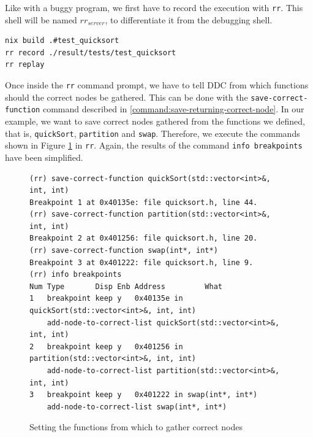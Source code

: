 Like with a buggy program, we first have to record the execution with \verb|rr|. This shell will be named \(rr_{server}\), to differentiate it from the debugging shell.
\begin{lstlisting}[language=bash, caption={Compiling, recording and replaying quickSort test cases}, frame=tb, label={lst:compileRecordReplayQuicksortTests}]
nix build .#test_quicksort
rr record ./result/tests/test_quicksort
rr replay
\end{lstlisting}
Once inside the \verb|rr| command prompt, we have to tell DDC from which functions should the correct nodes be gathered.
This can be done with the \verb|save-correct-function| command described in \ref{command:save-returning-correct-node}. In our example, we want to save correct nodes gathered from the functions we defined, that is, \verb|quickSort|, \verb|partition| and \verb|swap|. Therefore, we execute the commands shown in Figure \ref{fig:saving-correct-functions} in \verb|rr|. Again, the results of the command \verb|info breakpoints| have been simplified.
\begin{figure}[h]
    \centering
    \caption{Setting the functions from which to gather correct nodes}
    \label{fig:saving-correct-functions}
    \begin{verbatim}
(rr) save-correct-function quickSort(std::vector<int>&, int, int)
Breakpoint 1 at 0x40135e: file quicksort.h, line 44.
(rr) save-correct-function partition(std::vector<int>&, int, int) 
Breakpoint 2 at 0x401256: file quicksort.h, line 20.
(rr) save-correct-function swap(int*, int*) 
Breakpoint 3 at 0x401222: file quicksort.h, line 9.
(rr) info breakpoints
Num Type       Disp Enb Address         What
1   breakpoint keep y   0x40135e in quickSort(std::vector<int>&, int, int)
    add-node-to-correct-list quickSort(std::vector<int>&, int, int)
2   breakpoint keep y   0x401256 in partition(std::vector<int>&, int, int)
    add-node-to-correct-list partition(std::vector<int>&, int, int)
3   breakpoint keep y   0x401222 in swap(int*, int*)
    add-node-to-correct-list swap(int*, int*)
    \end{verbatim}
\end{figure}

